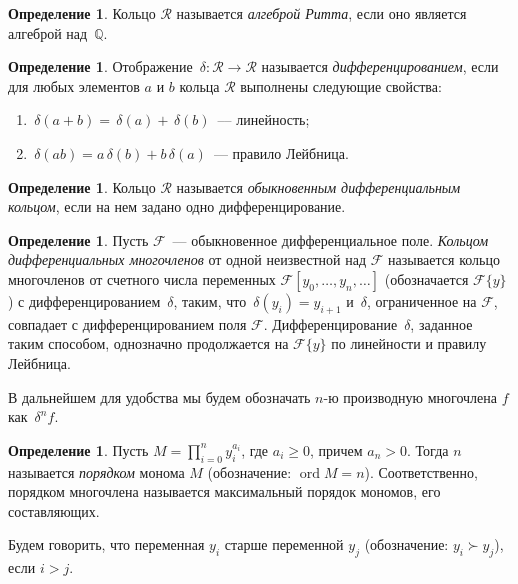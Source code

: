 \documentclass[11pt]{article}
\DeclareMathOperator{\ord}{ord}
\renewcommand{\ge}{\geqslant}
\newcommand{\diffField}{\mathcal{F}}
\theoremstyle{plain}
\theoremstyle{definition}
\newtheorem{definition}[theorem2]{Определение}
\theoremstyle{remark}
\begin{document}
\begin{definition}
Кольцо $\mathcal{R}$ называется \emph{алгеброй Ритта}, если оно является алгеброй над~$\mathbb{Q}$.
\end{definition}

\begin{definition}
Отображение $\,\delta: \mathcal{R} \to \mathcal{R}$ называется \emph{дифференцированием}, если для любых элементов $a$ и $b$ кольца $\mathcal{R}$
выполнены следующие свойства:
\begin{enumerate}
  \item $\,\delta(a+b)= \,\delta(a)+\,\delta(b)$~--– линейность;
  \item $\,\delta(ab)=a\,\delta(b)+b\,\delta(a)$~--- правило Лейбница.
\end{enumerate}
\end{definition}

\begin{definition}
Кольцо $\mathcal{R}$ называется \emph{обыкновенным дифференциальным кольцом}, если на нем задано одно дифференцирование.
\end{definition}

\begin{definition}
Пусть $\diffField$~--- обыкновенное дифференциальное поле.
\emph{Кольцом дифференциальных многочленов} от одной неизвестной над $\diffField$
называется кольцо многочленов от счетного числа переменных $\diffField[y_0,\ldots,y_n,\ldots]$
(обозначается $\diffField\{y\}$)
с дифференцированием $\,\delta$, таким, что $\,\delta(y_i)=y_{i+1}$ и $\,\delta$, ограниченное на $\diffField$, совпадает с дифференцированием поля $\diffField$. Дифференцирование $\,\delta$, заданное таким способом, однозначно продолжается на $\diffField\{y\}$ по линейности и правилу Лейбница.
\end{definition}

В дальнейшем для удобства мы будем обозначать $n$-ю производную многочлена $f$ как $\,\delta^n f$.

\begin{definition}
Пусть $M = \prod\limits_{i=0}^ny_i^{a_i}$, где $a_i \ge 0$, причем $a_n > 0$. Тогда $n$ называется \emph{порядком} монома $M$ (обозначение: $\ord M=n$). Соответственно, порядком многочлена называется максимальный порядок
мономов, его составляющих.
\end{definition}

Будем говорить, что переменная $y_i$ старше переменной $y_j$ (обозначение: $y_i \succ y_j$), если $i>j$.
\end{document}
